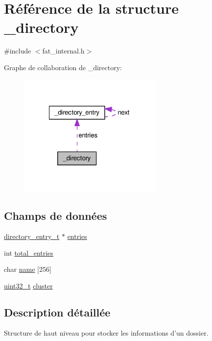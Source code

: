\hypertarget{struct__directory}{\section{Référence de la structure \+\_\+directory}
\label{struct__directory}
}


{\ttfamily \#include $<$fat\+\_\+internal.\+h$>$}



Graphe de collaboration de \+\_\+directory\+:\nopagebreak
\begin{figure}[H]
\begin{center}
\leavevmode
\includegraphics[width=203pt]{struct__directory__coll__graph}
\end{center}
\end{figure}
\subsection*{Champs de données}
\begin{DoxyCompactItemize}
\item 
\hyperlink{fat__internal_8h_ab6546cb0abf935a615fae20884a41818}{directory\+\_\+entry\+\_\+t} $\ast$ \hyperlink{struct__directory_a2aa96162372442698a14e116ce88110d}{entries}
\item 
int \hyperlink{struct__directory_aeb73476149e19828774d4dfbd96a051f}{total\+\_\+entries}
\item 
char \hyperlink{struct__directory_a535c678fe29215d35ac64200865147a4}{name} \mbox{[}256\mbox{]}
\item 
\hyperlink{kernel_2include_2types_8h_a33594304e786b158f3fb30289278f5af}{uint32\+\_\+t} \hyperlink{struct__directory_a5a45241095c7fb2a39f158638631ddbc}{cluster}
\end{DoxyCompactItemize}


\subsection{Description détaillée}
Structure de haut niveau pour stocker les informations d'un dossier. 

